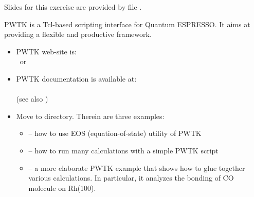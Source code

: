 \documentclass[landscape]{foils}
\begin{document}

Slides for this exercise are provided by file .
%


PWTK is a Tcl-based scripting interface for Quantum ESPRESSO. It aims
at providing a flexible and productive framework.

\begin{itemize}
\item PWTK web-site is:\\
   ~or~ 
\item PWTK documentation is available at:\\
  \\
  (see also )
\end{itemize}

\begin{itemize}
\item  Move to  directory. Therein are three
  examples:
  \begin{itemize}
  \item {} -- how to use EOS (equation-of-state) utility
    of PWTK
    \vspace{0.5em}
  \item {} -- how to run many calculations with a
    simple PWTK script
    \vspace{0.5em}
  \item {} -- a more elaborate PWTK example that
    shows how to glue together various calculations. In particular, it
    analyzes the bonding of CO molecule on Rh(100).
  \end{itemize}
\end{itemize}
\end{document}
